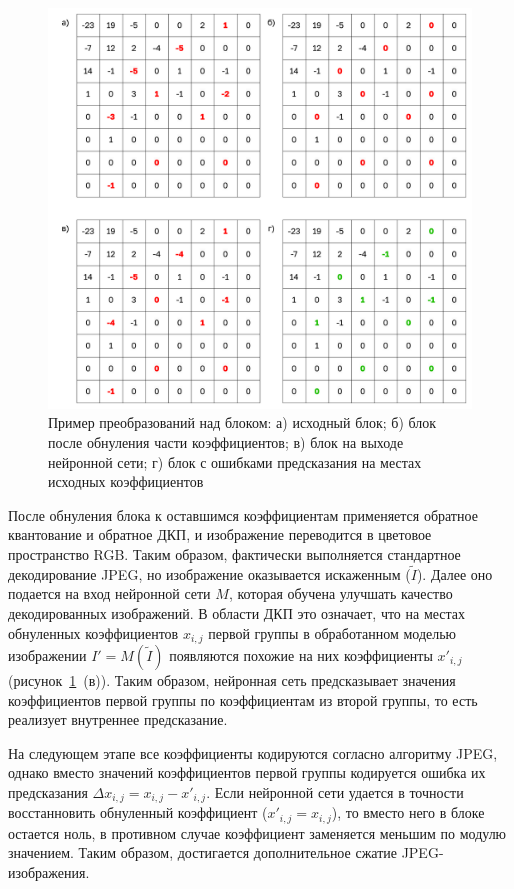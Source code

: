 \documentclass[times,specification,annotation]{itmo-student-thesis}
\begin{document}
\begin{figure}[!h]
    \centering
    \includegraphics[width=13cm]{./images/block-transformation-example.png}
    \caption{Пример преобразований над блоком: а) исходный блок; б) блок после обнуления части коэффициентов; в) блок на выходе нейронной сети; г) блок с ошибками предсказания на местах исходных коэффициентов}
    \label{image:block-transformation-example}
\end{figure}

После обнуления блока к оставшимся коэффициентам применяется обратное квантование и обратное ДКП, и изображение переводится в цветовое пространство RGB. Таким образом, фактически выполняется стандартное декодирование JPEG, но изображение оказывается искаженным ($\tilde{I}$). Далее оно подается на вход нейронной сети $M$, которая обучена улучшать качество декодированных изображений. В области ДКП это означает, что на местах обнуленных коэффициентов $x_{i,j}$ первой группы в обработанном моделью изображении $I'=M(\tilde{I})$ появляются похожие на них коэффициенты $x'_{i,j}$ (рисунок~\ref{image:block-transformation-example}~(в)). Таким образом, нейронная сеть предсказывает значения коэффициентов первой группы по коэффициентам из второй группы, то есть реализует внутреннее предсказание.\par

На следующем этапе все коэффициенты кодируются согласно алгоритму JPEG, однако вместо значений коэффициентов первой группы кодируется ошибка их предсказания $\Delta x_{i,j}=x_{i,j}-x'_{i,j}$. Если нейронной сети удается в точности восстанновить обнуленный коэффициент ($x'_{i,j}=x_{i,j}$), то вместо него в блоке остается ноль, в противном случае коэффициент заменяется меньшим по модулю значением. Таким образом, достигается дополнительное сжатие JPEG-изображения.\par
\end{document}
